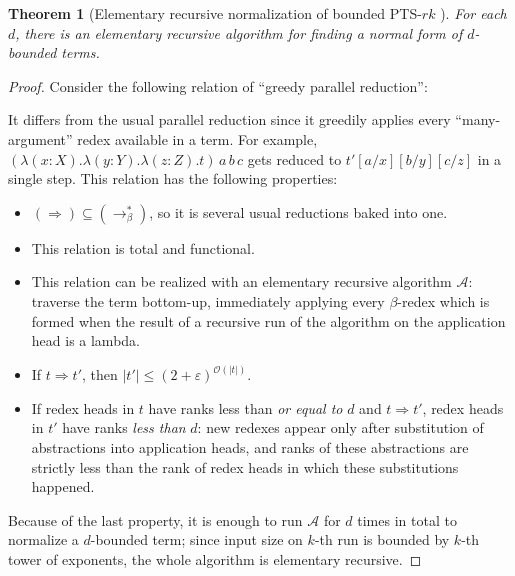 \documentclass{article}
\newtheorem{theorem}{Theorem}
\theoremstyle{definition}
\theoremstyle{remark}
\begin{document}
\begin{theorem}
    [Elementary recursive normalization of bounded
    PTS-$rk$
    ]
\label{bounded-sn}
    For each $d$, there is an elementary recursive
    algorithm \cite{rose1984subrecursion} for finding a
    normal form of $d$-bounded terms.
\end{theorem}
\begin{proof}
Consider the following relation of
``greedy parallel reduction'':
It differs from the usual parallel reduction since it
greedily applies every ``many-argument'' redex
available in a term. For example,
$(\lambda(x:X).\lambda(y:Y).\lambda(z:Z).t)\,a\,b\,c$
gets reduced to $t'[a/x][b/y][c/z]$ in a single step.
This relation has the following properties:
\begin{itemize}
    \item $(\Rightarrow)\subseteq(\to_\beta^*)$, so
        it is several usual reductions baked into one.
    \item This relation is total and functional.
    \item This relation can be realized with an
        elementary recursive algorithm $\mathcal{A}$:
        traverse the term bottom-up, immediately
        applying every $\beta$-redex which is formed
        when the result of a recursive run of the
        algorithm on the application head is a lambda.
    \item If $t\Rightarrow t'$, then
        $|t'|\le(2+\varepsilon)^{\mathcal{O}(|t|)}$.
    \item If redex heads in $t$ have ranks less than
        \emph{or equal to} $d$ and $t\Rightarrow t'$,
        redex heads in $t'$ have ranks \emph{less than}
        $d$: new redexes appear only after substitution
        of abstractions into application heads, and
        ranks of these abstractions are strictly less
        than the rank of redex heads in which these
        substitutions happened.
\end{itemize}
Because of the last property, it is enough to run
$\mathcal{A}$ for $d$ times in total to normalize a
$d$-bounded term; since input size on $k$-th run is
bounded by $k$-th tower of exponents, the whole
algorithm is elementary recursive.


\end{proof}
\end{document}
